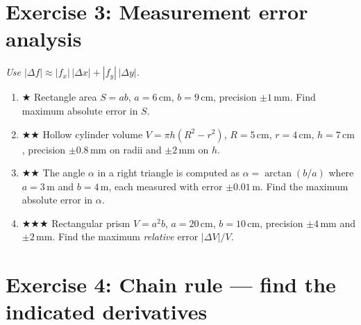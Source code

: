 \documentclass[12pt,a4paper]{article}
\newcommand{\easy}{{\color{green!60!black}$\bigstar$}}
\newcommand{\medium}{{\color{orange}$\bigstar\bigstar$}}
\newcommand{\hard}{{\color{red}$\bigstar\bigstar\bigstar$}}
\begin{document}
\section*{Exercise 3: Measurement error analysis}

\emph{Use $|\Delta f|\approx|f_x|\,|\Delta x|+|f_y|\,|\Delta y|$.}

\begin{enumerate}[leftmargin=*, label=(\alph*)]

\item \easy\quad
Rectangle area $S=ab$, $a=6\,\text{cm}$, $b=9\,\text{cm}$,
precision $\pm 1\,\text{mm}$. Find maximum absolute error in $S$.

\item \medium\quad
Hollow cylinder volume $V=\pi h(R^2-r^2)$,
$R=5\,\text{cm}$, $r=4\,\text{cm}$, $h=7\,\text{cm}$,
precision $\pm 0.8\,\text{mm}$ on radii and $\pm 2\,\text{mm}$ on $h$.

\item \medium\quad
The angle $\alpha$ in a right triangle is computed as $\alpha = \arctan(b/a)$
where $a = 3\,\text{m}$ and $b = 4\,\text{m}$, each measured with error $\pm 0.01\,\text{m}$.
Find the maximum absolute error in $\alpha$.

\item \hard\quad
Rectangular prism $V=a^2 b$, $a=20\,\text{cm}$, $b=10\,\text{cm}$,
precision $\pm 4\,\text{mm}$ and $\pm 2\,\text{mm}$.
Find the maximum \emph{relative} error $|\Delta V|/V$.

\end{enumerate}

\section*{Exercise 4: Chain rule --- find the indicated derivatives}
\end{document}
